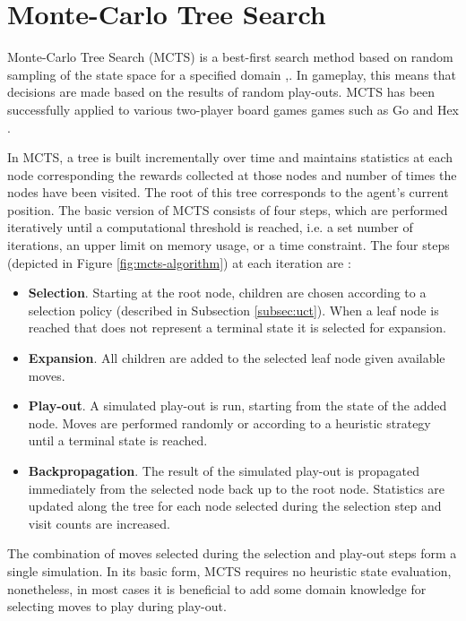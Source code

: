 \documentclass{ecai2010}
\begin{document}
\section{Monte-Carlo Tree Search}
\label{sec:mcts}
Monte-Carlo Tree Search (MCTS) is a best-first search method based on random sampling of the state space for a specified domain \cite{kocsis2006bandit},\cite{coulom2007efficient}. In gameplay, this means that decisions are made based on the results of random play-outs. MCTS has been successfully applied to various two-player board games games such as Go \cite{lee2010current} and Hex \cite{arneson2010monte}.

In MCTS, a tree is built incrementally over time and maintains statistics at each node corresponding the rewards collected at those nodes and number of times the nodes have been visited. The root of this tree corresponds to the agent's current position. The basic version of MCTS consists of four steps, which are performed iteratively until a computational threshold is reached, i.e. a set number of iterations, an upper limit on memory usage, or a time constraint. The four steps (depicted in Figure \ref{fig:mcts-algorithm}) at each iteration are \cite{chaslot2008progressive}:
\begin{itemize}
\item {\bf Selection}. Starting at the root node, children are chosen according to a selection policy (described in Subsection \ref{subsec:uct}). When a leaf node is reached that does not represent a terminal state it is selected for expansion.
\item {\bf Expansion}. All children are added to the selected leaf node given available moves.
\item {\bf Play-out}. A simulated play-out is run, starting from the state of the added node. Moves are performed randomly or according to a heuristic strategy until a terminal state is reached.
\item {\bf Backpropagation}. The result of the simulated play-out is propagated immediately from the selected node back up to the root node. Statistics are updated along the tree for each node selected during the selection step and visit counts are increased.
\end{itemize}
The combination of moves selected during the selection and play-out steps form a single simulation. In its basic form, MCTS requires no heuristic state evaluation, nonetheless, in most cases it is beneficial to add some domain knowledge for selecting moves to play during play-out.
\end{document}
